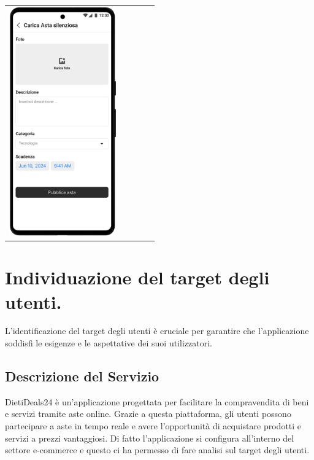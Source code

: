 \begin{center}
\begin{tabular}{ccccc}
		\includegraphics[height=280pt]{images/mockup/Carica Asta 1.1 Asta Silenziosa.png}       \\
	\end{tabular}
\end{center}





\newpage

\section{Individuazione del target degli utenti.}
L'identificazione del target degli utenti è cruciale per garantire che l'applicazione soddisfi le esigenze e le aspettative dei suoi utilizzatori.

\subsection*{Descrizione del Servizio}
DietiDeals24 è un'applicazione progettata per facilitare la compravendita di beni e servizi tramite aste online.
Grazie a questa piattaforma, gli utenti possono partecipare a aste in tempo reale e avere l'opportunità di acquistare prodotti e servizi a prezzi vantaggiosi.\sskip
Di fatto l'applicazione si configura all'interno del settore e-commerce e questo ci ha permesso di fare analisi sul target degli utenti.

